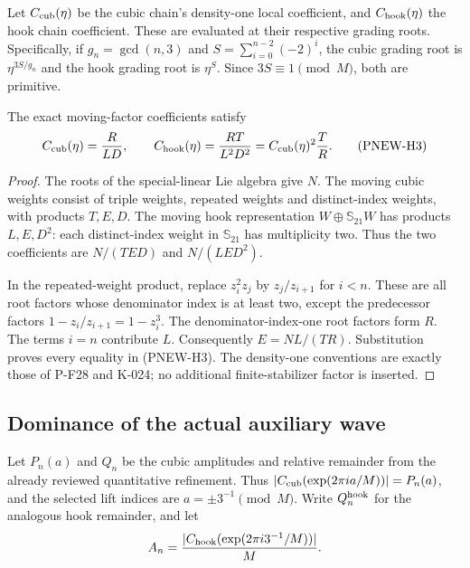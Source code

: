 Let $C_{\rm cub}(\eta)$ be the cubic chain's density-one local
coefficient, and $C_{\rm hook}(\eta)$ the hook chain coefficient.
These are evaluated at their respective grading roots. Specifically,
if $g_n=\gcd(n,3)$ and
$S=\sum_{i=0}^{n-2}(-2)^i$, the cubic grading root is
$\eta^{3S/g_n}$ and the hook grading root is $\eta^S$.
Since $3S\equiv1\pmod M$, both are primitive.

\begin{proposition}[PNEW-015a]
The exact moving-factor coefficients satisfy
\[
 C_{\rm cub}(\eta)=\frac{R}{LD},\qquad
 C_{\rm hook}(\eta)=\frac{RT}{L^2D^2}
                  =C_{\rm cub}(\eta)^2\frac{T}{R}.
                                                        \tag{PNEW-H3}
\]
\end{proposition}
\begin{proof}
The roots of the special-linear Lie algebra give $N$. The moving
cubic weights consist of triple weights, repeated weights and
distinct-index weights, with products $T,E,D$. The moving hook
representation $W\oplus\mathbb S_{21}W$ has products $L,E,D^2$:
each distinct-index weight in $\mathbb S_{21}$ has multiplicity two.
Thus the two coefficients are $N/(TED)$ and $N/(LED^2)$.

In the repeated-weight product, replace $z_i^2z_j$ by
$z_j/z_{i+1}$ for $i<n$. These are all root factors whose denominator
index is at least two, except the predecessor factors
$1-z_i/z_{i+1}=1-z_i^3$. The denominator-index-one root factors
form $R$. The terms $i=n$ contribute $L$. Consequently
$E=NL/(TR)$. Substitution proves every equality in (PNEW-H3).
The density-one conventions are exactly those of P-F28 and K-024;
no additional finite-stabilizer factor is inserted.
\end{proof}

\subsection*{Dominance of the actual auxiliary wave}

Let $P_n(a)$ and $Q_n$ be the cubic amplitudes and relative remainder
from the already reviewed quantitative refinement. Thus
$|C_{\rm cub}(\exp(2\pi ia/M))|=P_n(a)$, and the selected lift
indices are $a=\pm3^{-1}\pmod M$. Write $Q_n^{\rm hook}$ for the
analogous hook remainder, and let
\[
 A_n=\frac{|C_{\rm hook}(\exp(2\pi i3^{-1}/M))|}{M}.
\]

